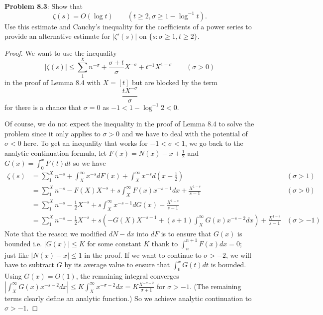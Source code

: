 \documentclass[12pt]{article}
\begin{document}
\fi

\textbf{Problem 8.3}: Show that
$$\zeta(s) = O(\log t) \qquad (t \geq 2, \sigma \geq 1 - \log^{-1} t).$$
Use this estimate and Cauchy's inequality for the coefficients of a power series to provide an alternative estimate for $|\zeta'(s)|$ on $\{s : \sigma \geq 1, t \geq 2\}$.

\begin{proof}
We want to use the inequality
$$|\zeta(s)| \leq \sum_1^X n^{-\sigma} + \frac{\sigma + t}{\sigma} X^{-\sigma} + t^{-1} X^{1-\sigma} \qquad (\sigma > 0)$$
in the proof of Lemma 8.4 with $X = [t]$ but are blocked by the term $$\frac{t X^{-\sigma}}{\sigma}$$
for there is a chance that $\sigma = 0$ as $-1 < 1 - \log^{-1} 2 < 0$.

Of course, we do not expect the inequality in the proof of Lemma 8.4 to solve the problem since it only applies to $\sigma > 0$ and we have to deal with the potential of $\sigma < 0$ here. To get an inequality that works for $-1 < \sigma < 1$, we go back to the analytic continuation formula, let $F(x) = N(x) - x + \frac12$ and $G(x) = \int_0^x F(t) dt$ so we have
\begin{align*}
\zeta(s) &= \sum_1^X n^{-s} + \int_X^\infty x^{-s} dF(x) + \int_X^\infty x^{-s} d\left(x - \frac12\right) &(\sigma > 1) \\
&= \sum_1^X n^{-s} - F(X) X^{-s} + s \int_X^\infty F(x) x^{-s-1} dx + \frac{X^{1-s}}{s-1} &(\sigma > 0)\\
&= \sum_1^X n^{-s} - \frac{1}{2} X^{-s} + s \int_X^\infty x^{-s-1} dG(x) + \frac{X^{1-s}}{s-1}\\
&= \sum_1^X n^{-s} - \frac{1}{2} X^{-s} + s \left(-G(X) X^{-s-1} + (s + 1) \int_X^\infty G(x) x^{-s-2} dx \right) + \frac{X^{1-s}}{s-1} &(\sigma > -1)
\end{align*}
Note that the reason we modified $dN - dx$ into $dF$ is to ensure that $G(x)$ is bounded i.e. $|G(x)| \leq K$ for some constant $K$ thank to $\int_n^{n+1} F(x) dx = 0$; just like $|N(x) - x| \leq 1$ in the proof. If we want to continue to $\sigma > -2$, we will have to subtract $G$ by its average value to ensure that $\int_0^x G(t) dt$ is bounded. Using $G(x) = O(1)$, the remaining integral converges $|\int_X^\infty G(x) x^{-s-2} dx| \leq K \int_X^\infty x^{-\sigma-2} dx = K \frac{X^{-\sigma - 2}}{\sigma + 1}$ for $\sigma > -1$. (The remaining terms clearly define an analytic function.) So we achieve analytic continuation to $\sigma > -1$.


\end{proof}
\end{document}
